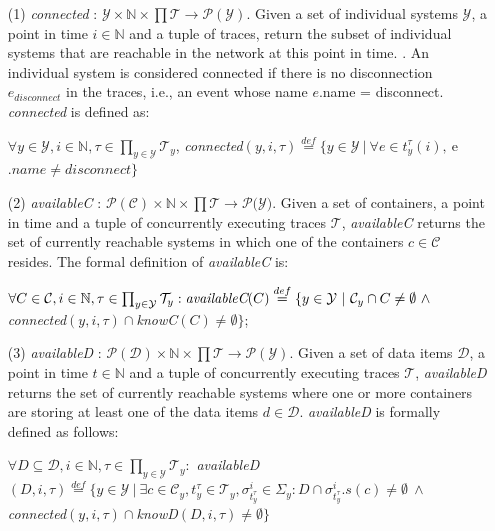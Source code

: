 \begin{enumerate}
    \item[(1)] \emph{connected} : $\mathcal{Y} \times \mathbb{N} \times \prod \mathcal{T} \to \mathcal{P(Y)}$. Given a set of individual systems $\mathcal{Y}$, a point in time $i \in \mathbb{N}$ and a tuple of traces, return the subset of individual systems that are reachable in the network at this point in time. . An individual system is considered connected if there is no disconnection $e_{disconnect}$ in the traces, i.e., an event whose name $e$.name = disconnect. \emph{connected} is defined as: 
    \begin{center}
     $\forall y \in \mathcal{Y}, i \in \mathbb{N},  \tau \in \prod_{y \in \mathcal{Y}} \mathcal{T}_{y}$, \emph{connected}$(y,i,\tau)\overset{def}{=} \{ y \in \mathcal{Y} \ | \ \forall e \in  t_{y}^{\tau}(i), \ $e$.name \neq disconnect\}$  
    \end{center}

    \item[(2)] \emph{availableC} : $\mathcal{P(C) } \times \mathbb{N} \times \prod \mathcal{T} \to \mathcal{P(Y})  $. Given a set of containers, a point in time and a tuple of concurrently executing traces $\mathcal{T}$, \emph{availableC} returns the set of currently reachable systems in which one of the containers $c \in \mathcal{C}$ resides. The formal definition of \emph{availableC} is:
    \begin{center}
    $\forall C \in \mathcal{C}, i \in \mathbb{N},  \tau \in \prod_{y \in \mathcal{Y}} \mathcal{T}_{y}: \emph{availableC}(C) \overset{def}{=} \{y \in \mathcal{Y} \ | \ \mathcal{C}_{y} \cap C \neq \emptyset\ \wedge$ \emph{connected}$(y,i,\tau) \cap $\emph{knowC}$(C) \neq \emptyset\} $;
    \end{center}
    
    \item[(3)] \emph{availableD} : $\mathcal{P}(\mathcal{D}) \times \mathbb{N} \times \prod \mathcal{T} \to \mathcal{P}(\mathcal{Y})$. Given a set of data items $\mathcal{D}$, a point in time $ t \in \mathbb{N}$ and a tuple of concurrently executing traces $\mathcal{T}$, \emph{availableD} returns the set of currently reachable systems where one or more containers are storing at least one of the data items $d \in \mathcal{D}$. \emph{availableD} is formally defined as follows:
    \begin{center}
      $\forall D \subseteq \mathcal{D}, i \in \mathbb{N}, \tau \in \prod_{y \in \mathcal{Y}} \mathcal{T}_{y}: $ \emph{availableD}$(D,i,\tau) \overset{def}{=} \{y \in \mathcal{Y} \ | \ \exists c \in \mathcal{C}_{y}, t_{y}^{\tau} \in \mathcal{T}_{y}, \sigma_{t_{y}^{\tau}}^{i} \in \Sigma_{y}: D  \cap \sigma_{t_{y}^{\tau}}^{i}.s(c)  \neq \emptyset \ \wedge$ \emph{connected}$(y,i,\tau) \cap$\emph{knowD}$(D,i,\tau) \neq \emptyset \}$
     \end{center}
\end{enumerate}

